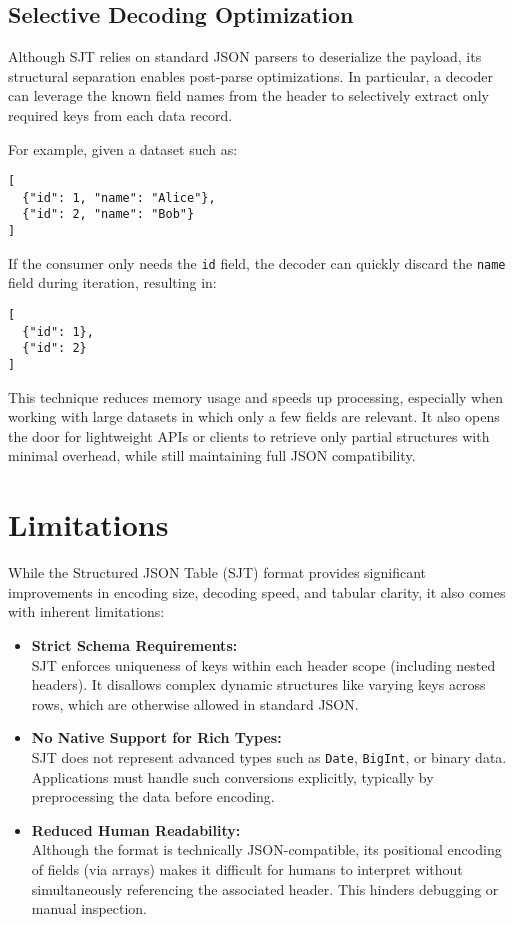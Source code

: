 \documentclass[12pt]{article}
\begin{document}
\subsection*{Selective Decoding Optimization}

Although SJT relies on standard JSON parsers to deserialize the payload, its structural separation enables post-parse optimizations. In particular, a decoder can leverage the known field names from the header to selectively extract only required keys from each data record.

For example, given a dataset such as:
\begin{verbatim}
[
  {"id": 1, "name": "Alice"},
  {"id": 2, "name": "Bob"}
]
\end{verbatim}

If the consumer only needs the \texttt{id} field, the decoder can quickly discard the \texttt{name} field during iteration, resulting in:
\begin{verbatim}
[
  {"id": 1},
  {"id": 2}
]
\end{verbatim}

This technique reduces memory usage and speeds up processing, especially when working with large datasets in which only a few fields are relevant. It also opens the door for lightweight APIs or clients to retrieve only partial structures with minimal overhead, while still maintaining full JSON compatibility.

\section{Limitations}

While the Structured JSON Table (SJT) format provides significant improvements in encoding size, decoding speed, and tabular clarity, it also comes with inherent limitations:

\begin{itemize}
  \item \textbf{Strict Schema Requirements:} \\
  SJT enforces uniqueness of keys within each header scope (including nested headers). It disallows complex dynamic structures like varying keys across rows, which are otherwise allowed in standard JSON.

  \item \textbf{No Native Support for Rich Types:} \\
  SJT does not represent advanced types such as \texttt{Date}, \texttt{BigInt}, or binary data. Applications must handle such conversions explicitly, typically by preprocessing the data before encoding.
   \item \textbf{Reduced Human Readability:} \\
  Although the format is technically JSON-compatible, its positional encoding of fields (via arrays) makes it difficult for humans to interpret without simultaneously referencing the associated header. This hinders debugging or manual inspection.
\end{itemize}
\end{document}
